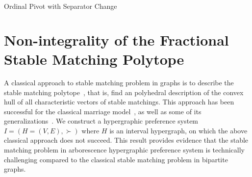 \documentclass[11pt]{article}
\begin{document}
\begin{algorithm}
\caption{Ordinal Pivot with Separator Change}\label{alg:op-arb}
\begin{algorithmic}
\Else
{}
\EndIf
\end{algorithmic}
\end{algorithm}

\section{Non-integrality of the Fractional Stable Matching Polytope}\label{sec:negative}




A classical approach to stable matching problem in graphs is to describe the stable matching polytope~\cite{teo1998geometry}, that is, find an polyhedral description of the convex hull of all characteristic vectors of stable matchings. This approach has been successful for the classical marriage model~\cite{rothblum1992characterization,vate1989linear}, as well as some of its generalizations~\cite{faenza2023affinely,fleiner2003stable}. We construct a hypergraphic preference system $I=(H=(V,E),\succ)$ where $H$ is an interval hypergraph, on which the above classical approach does not succeed. This result provides evidence that the stable matching problem in arborescence hypergraphic preference system is technically challenging compared to the classical stable matching problem in bipartite graphs. 
\end{document}
